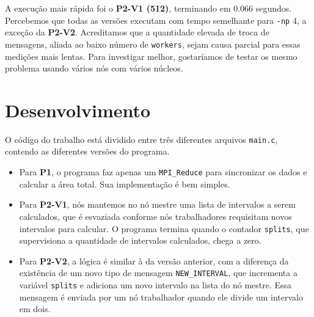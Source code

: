 \documentclass[12pt]{article}
\def\code#1{\texttt{#1}}
\begin{document}
A execução mais rápida foi o \textbf{P2-V1 (512)}, terminando em 0.066 segundos. Percebemos que todas as versões executam com tempo semelhante para \code{-np} 4, a exceção da \textbf{P2-V2}. Acreditamos que a quantidade elevada de troca de mensagens, aliada ao baixo número de \code{workers}, sejam causa parcial para essas medições mais lentas. Para investigar melhor, gostaríamos de testar os mesmo problema usando vários nós com vários núcleos.

\section*{Desenvolvimento}

O código do trabalho está dividido entre três diferentes arquivos \code{main.c}, contendo as diferentes versões do programa.

\begin{itemize}  
\item Para \textbf{P1}, o programa faz apenas um \code{MPI\_Reduce} para sincronizar os dados e calcular a área total. Sua implementação é bem simples.

\item Para \textbf{P2-V1}, nós mantemos no nó mestre uma lista de intervalos a serem calculados, que é esvaziada conforme nós trabalhadores requisitam novos intervalos para calcular. O programa termina quando o contador \code{splits}, que supervisiona a quantidade de intervalos calculados, chega a zero.

\item Para \textbf{P2-V2}, a lógica é similar à da versão anterior, com a diferença da existência de um novo tipo de mensagem \code{NEW\_INTERVAL}, que incrementa a variável \code{splits} e adiciona um novo intervalo na lista do nó mestre. Essa mensagem é enviada por um nó trabalhador quando ele divide um intervalo em dois.
\end{itemize}
\end{document}
